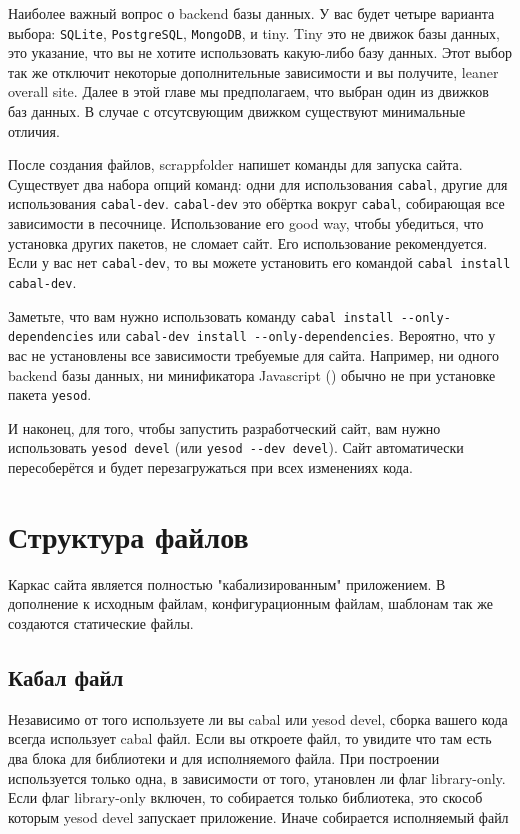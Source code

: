 Наиболее важный вопрос о backend базы данных. У вас будет четыре варианта 
выбора: \texttt{SQLite}, \texttt{PostgreSQL}, \texttt{MongoDB}, и tiny. 
Tiny это не движок базы данных, это указание, что вы не хотите использовать
какую-либо базу данных. Этот выбор так же отключит некоторые дополнительные
зависимости и вы получите, leaner overall site. Далее в этой главе мы предполагаем,
что выбран один из движков баз данных. В случае с отсутсвующим движком 
существуют минимальные отличия.

После создания файлов, scrappfolder напишет команды для запуска сайта.
Существует два набора опций команд: одни для использования \texttt{cabal},
другие для использования \texttt{cabal-dev}. \texttt{cabal-dev} это обёртка
вокруг \texttt{cabal}, собирающая все зависимости в песочнице. Использование
его good way, чтобы убедиться, что установка других пакетов, не сломает сайт.
Его использование рекомендуется. Если у вас нет \texttt{cabal-dev}, то вы можете
установить его командой \lstinline!cabal install cabal-dev!.

Заметьте, что вам нужно использовать команду \lstinline!cabal install --only-dependencies! 
или \lstinline!cabal-dev install --only-dependencies!. Вероятно, что у вас не 
установлены все зависимости требуемые для сайта. Например, ни одного backend
базы данных, ни минификатора Javascript ()
обычно не при установке пакета \texttt{yesod}.

И наконец, для того, чтобы запустить разработческий сайт, вам нужно использовать
\lstinline!yesod devel! (или \lstinline!yesod --dev devel!). Сайт автоматически
пересоберётся и будет перезагружаться при всех изменениях кода.

\section{Структура файлов}

Каркас сайта является полностью "кабализированным" приложением. В дополнение
к исходным файлам, конфигурационным файлам, шаблонам так же создаются статические файлы.

\subsection{Кабал файл}

Независимо от того используете ли вы cabal или yesod devel, сборка вашего кода всегда 
использует cabal файл. Если вы откроете файл, то увидите что там есть два блока для
библиотеки и для исполняемого файла. При построении используется только одна, в зависимости
от того, утановлен ли флаг library-only. Если флаг library-only включен, то собирается только
библиотека, это скособ которым yesod devel запускает приложение. Иначе собирается исполняемый файл

